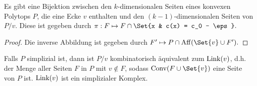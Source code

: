 \begin{st}
    Es gibt eine Bijektion zwischen den $k$-dimensionalen Seiten eines konvexen Polytops $P$, die eine Ecke $v$ enthalten und den $(k-1)$-dimensionalen Seiten von $P/v$.
    Diese ist gegeben durch
    \begin{math}
        \pi: F \mapsto F \cap \Set{x & c(x) = c_0 - \eps}.
    \end{math}
    \begin{proof}
        Die inverse Abbildung ist gegeben durch
        \begin{math}
            F' \mapsto P \cap \Aff(\Set{v} \cup F').
        \end{math}
    \end{proof}
\end{st}

\begin{df}
    Falls $P$ simplizial ist, dann ist $P/v$ kombinatorisch äquivalent zum  $\operatorname { Link }(v)$, d.h. der Menge aller Seiten $F$ in $P$ mit $v \not\in F$, sodass $\Conv(F \cup \Set{v})$ eine Seite von $P$ ist.
    $\operatorname { Link }(v)$ ist ein simplizialer Komplex.
\end{df}
